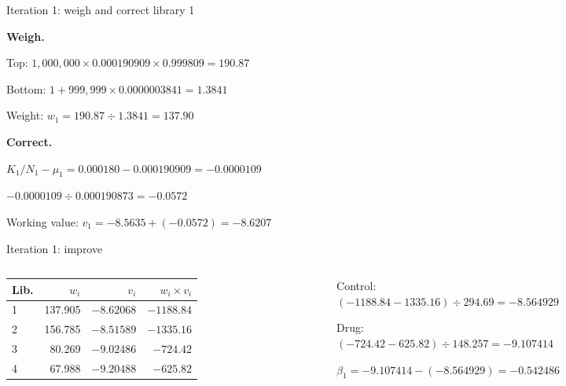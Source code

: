 \documentclass[aspectratio=169,11pt]{beamer}
\begin{document}
\begin{frame}{Iteration 1: weigh and correct library 1}
\begin{worked}[ 10b: library 1]
\textbf{Weigh.}

Top: $1{,}000{,}000 \times 0.000190909 \times 0.999809 = 190.87$

Bottom: $1 + 999{,}999 \times 0.0000003841 = 1.3841$

Weight: $w_1 = 190.87 \div 1.3841 = 137.90$

\medskip
\textbf{Correct.}

$K_1/N_1 - \mu_1 = 0.000180 - 0.000190909 = -0.0000109$

$-0.0000109 \div 0.000190873 = -0.0572$

Working value: $v_1 = -8.5635 + (-0.0572) = -8.6207$
\end{worked}
\end{frame}

\begin{frame}{Iteration 1: improve}
\begin{columns}[T]
\begin{column}{0.48\textwidth}
\centering\small
\begin{tabular}{@{}lrrr@{}}
\toprule
Lib. & $w_i$ & $v_i$ & $w_i \times v_i$\\
\midrule
1 & 137.905 & $-8.62068$ & $-1188.84$\\
2 & 156.785 & $-8.51589$ & $-1335.16$\\
3 &  80.269 & $-9.02486$ &  $-724.42$\\
4 &  67.988 & $-9.20488$ &  $-625.82$\\
\bottomrule
\end{tabular}
\end{column}
\begin{column}{0.5\textwidth}
\begin{worked}
\small
Control:\\ $(-1188.84 - 1335.16) \div 294.69 = -8.564929$

Drug:\\ $(-724.42 - 625.82) \div 148.257 = -9.107414$

$\beta_1 = -9.107414 - (-8.564929) = -0.542486$
\end{worked}
\end{column}
\end{columns}
\end{frame}
\end{document}
